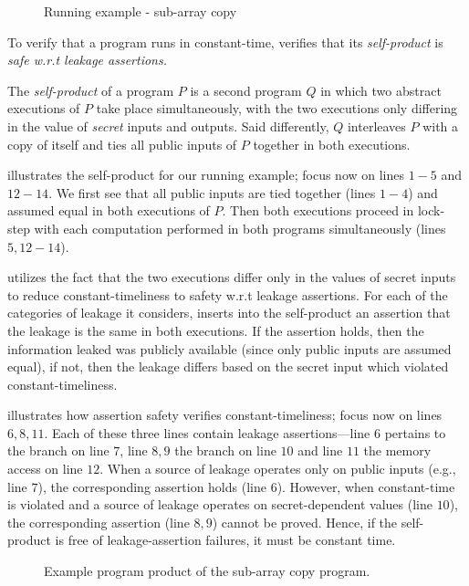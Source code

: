 \begin{figure}[h]
    \centering\resizebox{0.7\columnwidth}{!}{}
    \caption{Running example - sub-array copy}
    \label{fig:example}
\end{figure}

To verify that a program runs in constant-time, \ctVerif verifies that its \emph{self-product} is \emph{safe w.r.t leakage assertions.}

The \emph{self-product} of a program $P$ is a second program $Q$ in which two abstract executions of $P$ take place simultaneously, with the two executions only differing in the value of \emph{secret} inputs and outputs. Said differently, $Q$ interleaves $P$ with a copy of itself and ties all public inputs of $P$ together in both executions.

 illustrates the self-product for our running example; focus now on lines $1-5$ and $12-14$. We first see that all public inputs are tied together (lines $1-4$) and assumed equal in both executions of $P$. Then both executions proceed in lock-step with each computation performed in both programs simultaneously (lines $5,12-14$).

\ctVerif utilizes the fact that the two executions differ only in the values of secret inputs to reduce constant-timeliness to safety w.r.t leakage assertions. For each of the categories of leakage it considers, \ctVerif inserts into the self-product an assertion that the leakage is the same in both executions. If the assertion holds, then the information leaked was publicly available (since only public inputs are assumed equal), if not, then the leakage differs based on the secret input which violated constant-timeliness.

 illustrates how assertion safety verifies constant-timeliness; focus now on lines $6,8,11$. Each of these three lines contain leakage assertions---line $6$ pertains to the branch on line $7$, line $8,9$ the branch on line $10$ and line $11$ the memory access on line $12$.
When a source of leakage operates only on public inputs (e.g., line $7$), the corresponding assertion holds (line $6$). 
However, when constant-time is violated and a source of leakage operates on secret-dependent values (line $10$), the corresponding assertion (line $8,9$) cannot be proved. 
Hence, if the self-product is free of leakage-assertion failures, it must be constant time.

\begin{figure}[h]
    \centering\resizebox{0.9\columnwidth}{!}{}
    \caption{Example program product of the sub-array copy program.}
    \label{fig:example_prod}
\end{figure}

